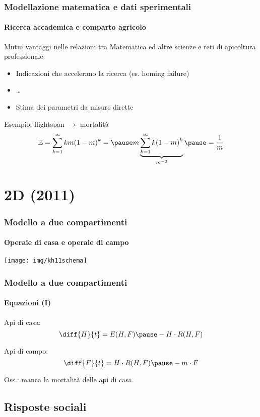 \documentclass[]{beamer}
\begin{document}
\begin{frame}
    \frametitle{Modellazione matematica e dati sperimentali}
    \framesubtitle{Ricerca accademica e comparto agricolo}

    Mutui vantaggi nelle relazioni tra Matematica ed altre scienze e reti di apicoltura professionale:
    \begin{itemize}
        \item Indicazioni che accelerano la ricerca \pause (es. homing failure)
        \item \pause \dots
        \item Stima dei parametri da misure dirette
    \end{itemize}

    \pause
    Esempio: flightspan $\to$ mortalità \pause
    $$ \mathbb{E} = \sum_{k=1}^{\infty} k m {(1-m)}^k = \pause
    m \underbrace{ \sum_{k=1}^{\infty} k {(1-m)}^k }_{m^{-2}}
    \pause = \frac{1}{m}$$
\end{frame}


\section{2D (2011)} %


\begin{frame}
    \frametitle{Modello a due compartimenti}
    \framesubtitle{Operaie di casa e operaie di campo}

    \cite{khoury2011}

    \pause
    \begin{center}
        \texttt{[image: img/kh11schema]}
    \end{center}
\end{frame}

\begin{frame}
    \frametitle{Modello a due compartimenti}
    \framesubtitle{Equazioni (I)}

    Api di casa:
    $$\diff{H}{t} = E(H,F) \pause - H \cdot R(H,F) $$

    \pause
    Api di campo:
    $$\diff{F}{t} = H \cdot R(H,F)  \pause - m \cdot F $$

    \pause
    Oss.: manca la mortalità delle api di casa.
\end{frame}


\subsection{Risposte sociali}
\end{document}
